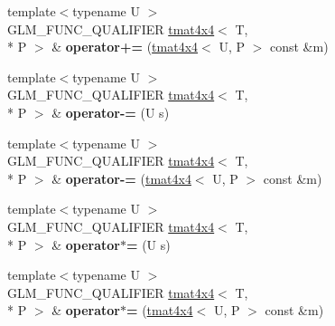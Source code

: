 \begin{DoxyCompactItemize}
\item 
\hypertarget{structglm_1_1detail_1_1tmat4x4_a4b8bef58c04e28a9ba1d58375cc6f6b0}{{\footnotesize template$<$typename U $>$ }\\G\-L\-M\-\_\-\-F\-U\-N\-C\-\_\-\-Q\-U\-A\-L\-I\-F\-I\-E\-R \hyperlink{structglm_1_1detail_1_1tmat4x4}{tmat4x4}$<$ T, \\*
P $>$ \& {\bfseries operator+=} (\hyperlink{structglm_1_1detail_1_1tmat4x4}{tmat4x4}$<$ U, P $>$ const \&m)}\label{structglm_1_1detail_1_1tmat4x4_a4b8bef58c04e28a9ba1d58375cc6f6b0}

\item 
\hypertarget{structglm_1_1detail_1_1tmat4x4_ae950a3daa2e47531f7f3763192ebcf5b}{{\footnotesize template$<$typename U $>$ }\\G\-L\-M\-\_\-\-F\-U\-N\-C\-\_\-\-Q\-U\-A\-L\-I\-F\-I\-E\-R \hyperlink{structglm_1_1detail_1_1tmat4x4}{tmat4x4}$<$ T, \\*
P $>$ \& {\bfseries operator-\/=} (U s)}\label{structglm_1_1detail_1_1tmat4x4_ae950a3daa2e47531f7f3763192ebcf5b}

\item 
\hypertarget{structglm_1_1detail_1_1tmat4x4_aeba2224c00c02c2f7eca1b0675a85e70}{{\footnotesize template$<$typename U $>$ }\\G\-L\-M\-\_\-\-F\-U\-N\-C\-\_\-\-Q\-U\-A\-L\-I\-F\-I\-E\-R \hyperlink{structglm_1_1detail_1_1tmat4x4}{tmat4x4}$<$ T, \\*
P $>$ \& {\bfseries operator-\/=} (\hyperlink{structglm_1_1detail_1_1tmat4x4}{tmat4x4}$<$ U, P $>$ const \&m)}\label{structglm_1_1detail_1_1tmat4x4_aeba2224c00c02c2f7eca1b0675a85e70}

\item 
\hypertarget{structglm_1_1detail_1_1tmat4x4_af93523cd38761d56f5e3695085976f57}{{\footnotesize template$<$typename U $>$ }\\G\-L\-M\-\_\-\-F\-U\-N\-C\-\_\-\-Q\-U\-A\-L\-I\-F\-I\-E\-R \hyperlink{structglm_1_1detail_1_1tmat4x4}{tmat4x4}$<$ T, \\*
P $>$ \& {\bfseries operator$\ast$=} (U s)}\label{structglm_1_1detail_1_1tmat4x4_af93523cd38761d56f5e3695085976f57}

\item 
\hypertarget{structglm_1_1detail_1_1tmat4x4_a626eae06d9a644a9044db04a1138bbdd}{{\footnotesize template$<$typename U $>$ }\\G\-L\-M\-\_\-\-F\-U\-N\-C\-\_\-\-Q\-U\-A\-L\-I\-F\-I\-E\-R \hyperlink{structglm_1_1detail_1_1tmat4x4}{tmat4x4}$<$ T, \\*
P $>$ \& {\bfseries operator$\ast$=} (\hyperlink{structglm_1_1detail_1_1tmat4x4}{tmat4x4}$<$ U, P $>$ const \&m)}\label{structglm_1_1detail_1_1tmat4x4_a626eae06d9a644a9044db04a1138bbdd}


\end{DoxyCompactItemize}

